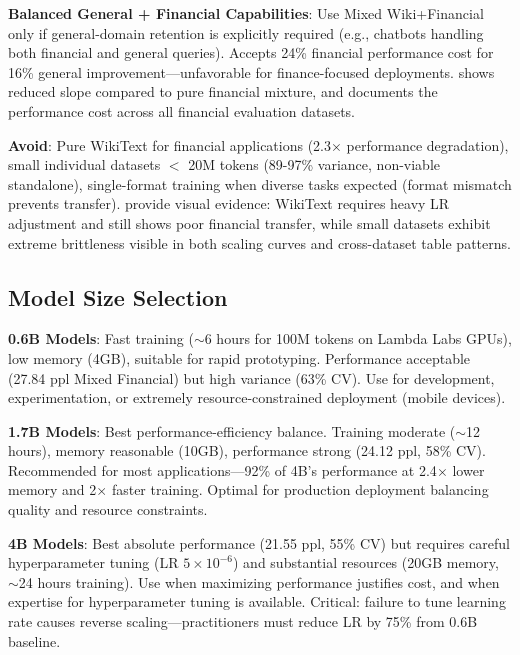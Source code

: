 \textbf{Balanced General + Financial Capabilities}: Use Mixed Wiki+Financial only if general-domain retention is explicitly required (e.g., chatbots handling both financial and general queries). Accepts 24\% financial performance cost for 16\% general improvement—unfavorable for finance-focused deployments.  shows reduced slope compared to pure financial mixture, and  documents the performance cost across all financial evaluation datasets.

\textbf{Avoid}: Pure WikiText for financial applications (2.3$\times$ performance degradation), small individual datasets $<$ 20M tokens (89-97\% variance, non-viable standalone), single-format training when diverse tasks expected (format mismatch prevents transfer).  provide visual evidence: WikiText requires heavy LR adjustment and still shows poor financial transfer, while small datasets exhibit extreme brittleness visible in both scaling curves and cross-dataset table patterns.

\subsection{Model Size Selection}

\textbf{0.6B Models}: Fast training ($\sim$6 hours for 100M tokens on Lambda Labs GPUs), low memory (4GB), suitable for rapid prototyping. Performance acceptable (27.84 ppl Mixed Financial) but high variance (63\% CV). Use for development, experimentation, or extremely resource-constrained deployment (mobile devices).

\textbf{1.7B Models}: Best performance-efficiency balance. Training moderate ($\sim$12 hours), memory reasonable (10GB), performance strong (24.12 ppl, 58\% CV). Recommended for most applications—92\% of 4B's performance at 2.4$\times$ lower memory and 2$\times$ faster training. Optimal for production deployment balancing quality and resource constraints.

\textbf{4B Models}: Best absolute performance (21.55 ppl, 55\% CV) but requires careful hyperparameter tuning (LR $5 \times 10^{-6}$) and substantial resources (20GB memory, $\sim$24 hours training). Use when maximizing performance justifies cost, and when expertise for hyperparameter tuning is available. Critical: failure to tune learning rate causes reverse scaling—practitioners must reduce LR by 75\% from 0.6B baseline.

